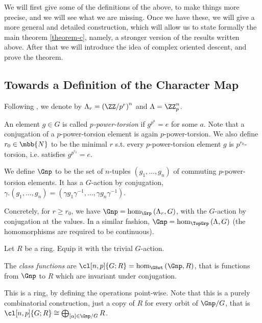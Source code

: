 We will first give some of the definitions of the above, to make things more precise, and we will see what we are missing.
Once we have these, we will give a more general and detailed construction, which will allow us to state formally the main theorem \ref{theorem-c}, namely, a stronger version of the results written above.
After that we will introduce the idea of complex oriented descent, and prove the theorem.



\subsection{Towards a Definition of the Character Map}

Following \cite{HKR}, we denote by $\Lambda_r = \left(\ZZ/{p^r}\right)^n$ and $\Lambda = \ZZ_p^n$.

An element $g \in G$ is called \emph{$p$-power-torsion} if $g^{p^a} = e$ for some $a$.
Note that a conjugation of a $p$-power-torsion element is again $p$-power-torsion.
We also define $r_0 \in \mbb{N}$ to be the minimal $r$ s.t. every $p$-power-torsion element $g$ is $p^{r_0}$-torsion, i.e. satisfies $g^{p^{r_0}} = e$.

\begin{definition}
	We define $\Gnp$ to be the set of $n$-tuples $\left(g_1, \dotsc, g_n\right)$ of commuting $p$-power-torsion elements.
	It has a $G$-action by conjugation, $\gamma. \left(g_1, \dotsc, g_n\right) = \left(\gamma g_1 \gamma^{-1}, \dotsc, \gamma g_n \gamma^{-1}\right)$.
\end{definition}

Concretely, for $r \geq r_0$, we have $\Gnp = \hom_{\Grp}\left(\Lambda_r, G\right)$, with the $G$-action by conjugation at the values.
In a similar fashion, $\Gnp = \hom_{\TopGrp}\left(\Lambda, G\right)$ (the homomorphisms are required to be continuous).

Let $R$ be a ring.
Equip it with the trivial $G$-action.

\begin{definition}\label{class-function-*}
	The \emph{class functions} are $\cl[n,p]{G; R} = \hom_{\GSet}\left(\Gnp, R\right)$, that is functions from $\Gnp$ to $R$ which are invariant under conjugation.
\end{definition}

This is a ring, by defining the operations point-wise.
Note that this is a purely combinatorial construction, just a copy of $R$ for every orbit of $\Gnp/G$, that is $\cl[n,p]{G; R} \cong \bigoplus_{\left[\alpha\right] \in \Gnp/G} R$.

